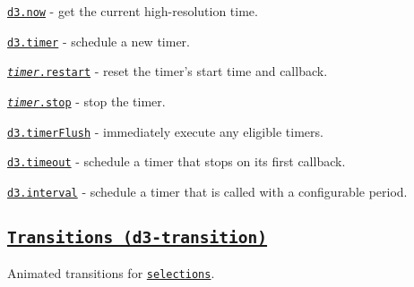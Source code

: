 \begin{DoxyItemize}
\item \href{https://github.com/d3/d3-timer/blob/master/README.md#now}{\tt d3.\+now} -\/ get the current high-\/resolution time.
\item \href{https://github.com/d3/d3-timer/blob/master/README.md#timer}{\tt d3.\+timer} -\/ schedule a new timer.
\item \href{https://github.com/d3/d3-timer/blob/master/README.md#timer_restart}{\tt {\itshape timer}.restart} -\/ reset the timer’s start time and callback.
\item \href{https://github.com/d3/d3-timer/blob/master/README.md#timer_stop}{\tt {\itshape timer}.stop} -\/ stop the timer.
\item \href{https://github.com/d3/d3-timer/blob/master/README.md#timerFlush}{\tt d3.\+timer\+Flush} -\/ immediately execute any eligible timers.
\item \href{https://github.com/d3/d3-timer/blob/master/README.md#timeout}{\tt d3.\+timeout} -\/ schedule a timer that stops on its first callback.
\item \href{https://github.com/d3/d3-timer/blob/master/README.md#interval}{\tt d3.\+interval} -\/ schedule a timer that is called with a configurable period.
\end{DoxyItemize}

\subsection*{\href{https://github.com/d3/d3-transition}{\tt Transitions (d3-\/transition)}}

Animated transitions for \href{#selections}{\tt selections}.



